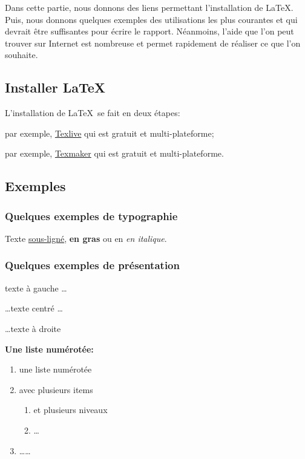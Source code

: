 \documentclass[a4paper,12pt]{article}
\begin{document}
Dans cette partie, nous donnons des liens permettant l'installation de \LaTeX. Puis, nous donnons quelques exemples des utilisations les plus courantes et qui devrait être suffisantes pour écrire le rapport. Néanmoins, l'aide que l'on peut trouver sur Internet est nombreuse et permet rapidement de réaliser ce que l'on souhaite.

\subsection{Installer \LaTeX}

L'installation de \LaTeX~se fait en deux étapes:
\begin{description}[align=right,labelwidth=5cm]
\item[un compilateur:] par exemple, \href{https://tug.org/texlive/}{Texlive} qui est gratuit et multi-plateforme;
\item[un éditeur:] par exemple, \href{http://www.xm1math.net/texmaker/}{Texmaker} qui est gratuit et multi-plateforme.
\end{description}

\subsection{Exemples}

\subsubsection{Quelques exemples de typographie}

Texte \underline{sous-ligné}, \textbf{en gras} ou en \textit{en italique}.

\subsubsection{Quelques exemples de présentation}

\begin{flushleft} texte à gauche \dots \end{flushleft}

\begin{center} \dots texte centré \dots \end{center}

\begin{flushright} \dots texte à droite \end{flushright}


\textbf{Une liste numérotée:}
\begin{enumerate}
\item une liste numérotée
\item avec plusieurs items
\begin{enumerate}
\item et plusieurs niveaux
\item \dots
\end{enumerate}
\item \dots \dots
\end{enumerate}
\end{document}
